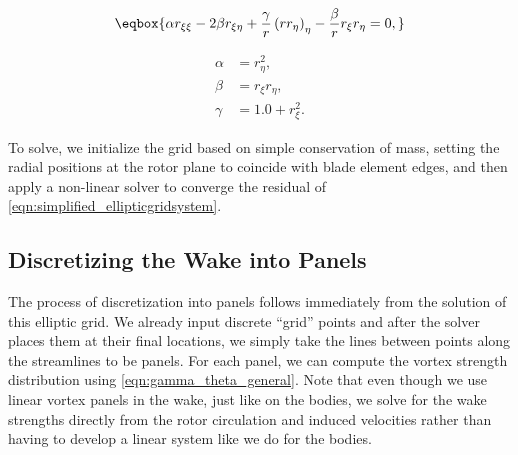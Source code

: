\begin{equation}
\label{eqn:simplified_ellipticgridsystem}
\eqbox{
        \alpha r_{\xi\xi} - 2 \beta r_{\xi\eta} + \frac{\gamma}{r} \left(r r_{\eta}\right)_\eta - \frac{\beta}{r}  r_\xi r_\eta = 0,
}
\end{equation}

\where

\begin{align}
    \alpha &= r_\eta^2, \\
    \beta &= r_\xi r_\eta, \\
    \gamma &= 1.0 + r_\xi^2.
\end{align}

To solve, we initialize the grid based on simple conservation of mass, setting the radial positions at the rotor plane to coincide with blade element edges, and then apply a non-linear solver to converge the residual of \cref{eqn:simplified_ellipticgridsystem}.


\subsection{Discretizing the Wake into Panels}

The process of discretization into panels follows immediately from the solution of this elliptic grid.
%
We already input discrete ``grid'' points and after the solver places them at their final locations, we simply take the lines between points along the streamlines to be panels.
%
For each panel, we can compute the vortex strength distribution using \cref{eqn:gamma_theta_general}.
%
Note that even though we use linear vortex panels in the wake, just like on the bodies, we solve for the wake strengths directly from the rotor circulation and induced velocities rather than having to develop a linear system like we do for the bodies.



%
%
%
%
